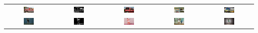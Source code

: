 \begin{table}[hbp]
{\begin{tabular}{c c c c c}
        \includegraphics[width=0.23\textwidth]{./assets/base_image_00065485.pdf} & \includegraphics[width=0.23\textwidth]{./assets/hed_image_00065485.pdf} & \includegraphics[width=0.23\textwidth]{./assets/piti_image_00065485.pdf} & \includegraphics[width=0.23\textwidth]{./assets/control_image_00065485.pdf} & \includegraphics[width=0.23\textwidth]{./assets/prompt_control_image_00065485.pdf} \\
        \includegraphics[width=0.23\textwidth]{./assets/base_image_00065736.pdf} & \includegraphics[width=0.23\textwidth]{./assets/hed_image_00065736.pdf} & \includegraphics[width=0.23\textwidth]{./assets/piti_image_00065736.pdf} & \includegraphics[width=0.23\textwidth]{./assets/control_image_00065736.pdf} & \includegraphics[width=0.23\textwidth]{./assets/prompt_control_image_00065736.pdf} \\

\end{tabular}}
\end{table}
